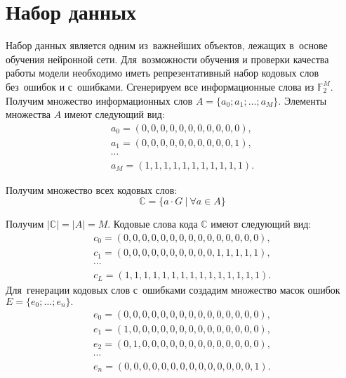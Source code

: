 \section{Набор данных}

Набор данных является одним из~важнейших объектов, лежащих в~основе обучения нейронной сети. Для~возможности обучения и проверки качества работы модели необходимо иметь репрезентативный\cite{bib:representative_data_sets} набор кодовых слов без~ошибок и с~ошибками.
Сгенерируем все информационные слова из $\mathbb{F}_2^M$. Получим множество информационных слов $A = \{a_0; a_1; \dots; a_M\}$. Элементы множества $A$ имеют следующий вид:
\begin{gather}
  \nonumber a_0 = (0, 0, 0, 0, 0, 0, 0, 0, 0, 0, 0), \\
  \nonumber a_1 = (0, 0, 0, 0, 0, 0, 0, 0, 0, 0, 1), \\
  \nonumber \cdots \\
  \nonumber a_M = (1, 1, 1, 1, 1, 1, 1, 1, 1, 1, 1).
\end{gather}

Получим множество всех кодовых слов:
\begin{equation*}
  \mathbb{C} = \{a\cdot G~|~\forall a \in A \}
\end{equation*}

Получим $|\mathbb{C}| = |A| = M$. Кодовые слова кода $\mathbb{C}$ имеют следующий вид:
\begin{gather}
    \nonumber c_0 = (0, 0, 0, 0, 0, 0, 0, 0, 0, 0, 0, 0, 0, 0, 0), \\
    \nonumber c_1 = (0, 0, 0, 0, 0, 0, 0, 0, 0, 0, 1, 1, 1, 1, 1), \\
    \nonumber \cdots \\
    \nonumber c_L = (1, 1, 1, 1, 1, 1, 1, 1, 1, 1, 1, 1, 1, 1, 1).
\end{gather}
\newpage
Для~генерации кодовых слов с~ошибками создадим множество масок ошибок $E = \{e_0; \dots; e_n\}.$
\begin{gather}
    \nonumber e_0 = (0, 0, 0, 0, 0, 0, 0, 0, 0, 0, 0, 0, 0, 0, 0), \\
    \nonumber e_1 = (1, 0, 0, 0, 0, 0, 0, 0, 0, 0, 0, 0, 0, 0, 0), \\
    \nonumber e_2 = (0, 1, 0, 0, 0, 0, 0, 0, 0, 0, 0, 0, 0, 0, 0), \\
    \nonumber \cdots                                                \\
    \nonumber e_n = (0, 0, 0, 0, 0, 0, 0, 0, 0, 0, 0, 0, 0, 0, 1).
\end{gather}

